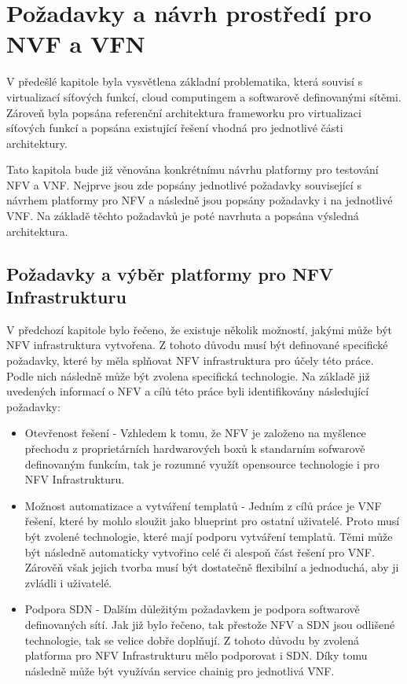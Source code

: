 \chapter{Požadavky a návrh prostředí pro NVF a VFN}

V předešlé kapitole byla vysvětlena základní problematika, která souvisí s virtualizací síťových funkcí, cloud computingem a softwarově definovanými sítěmi. Zároveň byla popsána referenční architektura frameworku pro virtualizaci síťových funkcí a popsána existující řešení vhodná pro jednotlivé části architektury.

Tato kapitola bude již věnována konkrétnímu návrhu platformy pro testování NFV a VNF. Nejprve jsou zde popsány jednotlivé požadavky související s návrhem platformy pro NFV a následně jsou popsány požadavky i na jednotlivé VNF. Na základě těchto požadavků je poté navrhuta a popsána výsledná architektura.

\section{Požadavky a výběr platformy pro NFV Infrastrukturu}

V předchozí kapitole bylo řečeno, že existuje několik možností, jakými může být NFV infrastruktura vytvořena. Z tohoto důvodu musí být definované specifické požadavky, které by měla splňovat NFV infrastruktura pro účely této práce. Podle nich následně může být zvolena specifická technologie. Na základě již uvedených informací o NFV a cílů této práce byli identifikovány následující požadavky:

\begin{itemize}
\item Otevřenost řešení - Vzhledem k tomu, že NFV je založeno na myšlence přechodu z proprietárních hardwarových boxů k standarním sofwarově definovaným funkcím, tak je rozumné využít opensource technologie i pro NFV Infrastrukturu. 
\item Možnost automatizace a vytváření templatů - Jedním z cílů práce je VNF řešení, které by mohlo sloužit jako blueprint pro ostatní uživatelé. Proto musí být zvolené technologie, které mají podporu vytváření templatů. Těmi může být následně automaticky vytvořino celé či alespoň část řešení pro VNF. Zárověň však jejich tvorba musí být dostatečně flexibilní a jednoduchá, aby ji zvládli i uživatelé.
\item Podpora SDN - Dalším důležitým požadavkem je podpora softwarově definovaných sítí. Jak již bylo řečeno, tak přestože NFV a SDN jsou odlišené technologie, tak se velice dobře doplňují. Z tohoto důvodu by zvolená platforma pro NFV Infrastrukturu mělo podporovat i SDN. Díky tomu následně může být využíván service chainig pro jednotlivá VNF. 
\end{itemize}

